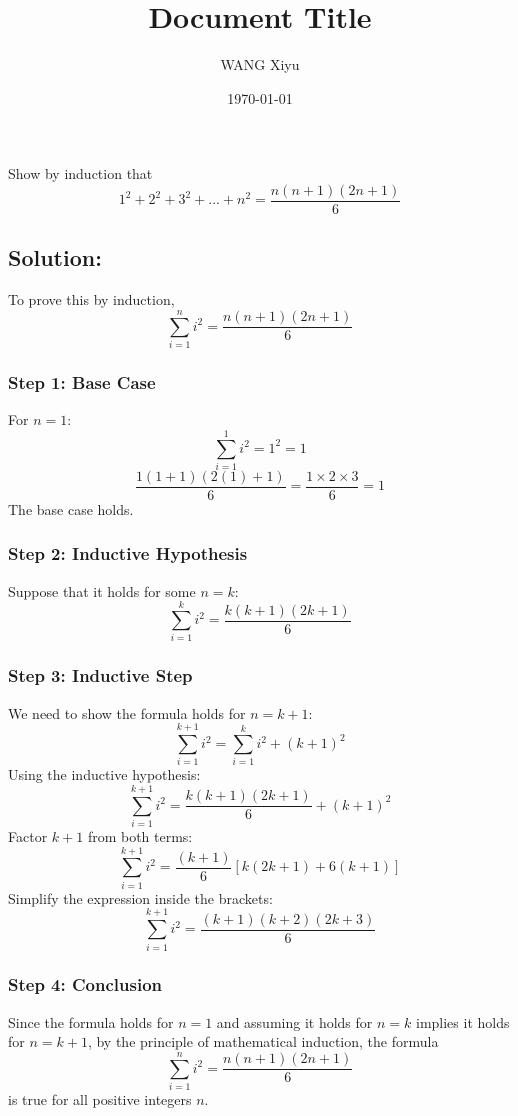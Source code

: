 \documentclass[12pt]{article}
\title{Document Title}
\author{WANG Xiyu}
\date{\today}
\begin{document}
\maketitle

\tableofcontents 

\section{}
Show by induction that
\[
    1^2 + 2^2 + 3^2 + ... + n^2 = \frac{n(n+1)(2n+1)}{6}    
\]
\subsection*{Solution:}

To prove this by induction, 
\[
\sum_{i = 1}^{n} i^2 = \frac{n(n+1)(2n+1)}{6}
\]

\subsubsection*{Step 1: Base Case}
For \(n = 1\):
\[
\sum_{i=1}^{1} i^2 = 1^2 = 1
\]
\[
\frac{1(1+1)(2(1)+1)}{6} = \frac{1 \times 2 \times 3}{6} = 1
\]
The base case holds.

\subsubsection*{Step 2: Inductive Hypothesis}
Suppose that it holds for some \(n = k\):
\[
\sum_{i = 1}^{k} i^2 = \frac{k(k+1)(2k+1)}{6}
\]

\subsubsection*{Step 3: Inductive Step}
We need to show the formula holds for \(n = k+1\):
\[
\sum_{i=1}^{k+1} i^2 = \sum_{i=1}^{k} i^2 + (k+1)^2
\]
Using the inductive hypothesis:
\[
\sum_{i=1}^{k+1} i^2 = \frac{k(k+1)(2k+1)}{6} + (k+1)^2
\]
Factor \(k+1\) from both terms:
\[
\sum_{i=1}^{k+1} i^2 = \frac{(k+1)}{6} \left[k(2k+1) + 6(k+1)\right]
\]
Simplify the expression inside the brackets:
\[
\sum_{i=1}^{k+1} i^2 = \frac{(k+1)(k+2)(2k+3)}{6}
\]

\subsubsection*{Step 4: Conclusion}
Since the formula holds for \(n = 1\) and assuming it holds for \(n = k\) implies it holds for \(n = k+1\), by the principle of mathematical induction, the formula
\[
\sum_{i = 1}^{n} i^2 = \frac{n(n+1)(2n+1)}{6}
\]
is true for all positive integers \(n\).
\end{document}
